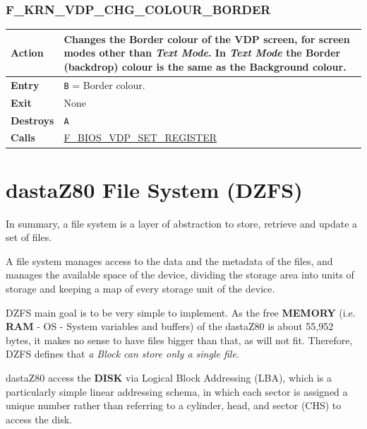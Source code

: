 \documentclass[a4paper,11pt]{article}
\begin{document}
        \subsubsection{F\_KRN\_VDP\_CHG\_COLOUR\_BORDER}
        \label{func:fkrnvdpchgcolourborder}
        \begin{tabular}{l p{9cm}}
            \hline\textbf{Action}
            & Changes the Border colour of the \textbf{VDP} screen, for screen
            modes other than \textit{Text Mode}. In \textit{Text Mode} the
            Border (backdrop) colour is the same as the Background colour.\\
            \hline\textbf{Entry} & \texttt{B} = Border colour.\\
            \hline\textbf{Exit} & None\\
            \hline\textbf{Destroys} & \texttt{A}\\
            \hline\textbf{Calls}
            & \hyperref[func:fbiosvdpsetregister]{F\_BIOS\_VDP\_SET\_REGISTER}\\
            \hline
        \end{tabular}

    \pagebreak
    \section{dastaZ80 File System (DZFS)}
    In summary, a file system is a layer of abstraction to store, retrieve and
    update a set of files.

    A file system manages access to the data and the metadata of the files, and
    manages the available space of the device, dividing the storage area into
    units of storage and keeping a map of every storage unit of the device.
    
    DZFS main goal is to be very simple to implement. As the free
    \textbf{MEMORY} (i.e. \textbf{RAM} - OS - System variables and buffers) of
    the dastaZ80 is about 55,952 bytes, it makes no sense to have files bigger
    than that, as will not fit. Therefore, DZFS defines that \textit{a Block can
    store only a single file}.

    dastaZ80 access the \textbf{DISK} via Logical Block Addressing (LBA), which
    is a particularly simple linear addressing schema, in which each sector is
    assigned a unique number rather than referring to a cylinder, head, and
    sector (CHS) to access the disk.
    
\end{document}
